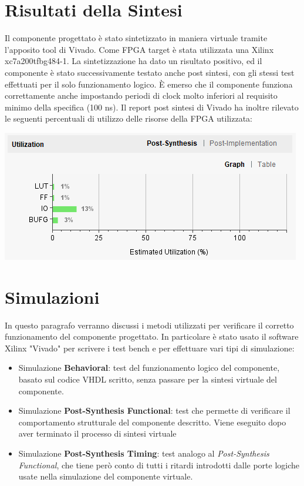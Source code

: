 \documentclass{article}
\begin{document}
\section{Risultati della Sintesi}
Il componente progettato è stato sintetizzato in maniera virtuale tramite l'apposito tool di Vivado. Come FPGA target è stata utilizzata una Xilinx xc7a200tfbg484-1. La sintetizzazione ha dato un risultato positivo, ed il componente è stato successivamente testato anche post sintesi, con gli stessi test effettuati per il solo funzionamento logico. È emerso che il componente funziona correttamente anche impostando periodi di clock molto inferiori al requisito minimo della specifica (100 ns). Il report post sintesi di Vivado ha inoltre rilevato le seguenti percentuali di utilizzo delle risorse della FPGA utilizzata: 
\begin{center}
\includegraphics[scale=0.8]{postSynthesisUtilization} \\
\end{center}

\section{Simulazioni}

In questo paragrafo verranno discussi i metodi utilizzati per verificare il corretto funzionamento del componente progettato. In particolare è stato usato il software Xilinx "Vivado" per scrivere i test bench e per effettuare vari tipi di simulazione:

\begin{itemize}

\item Simulazione \textbf{Behavioral}: test del funzionamento logico del componente, basato sul codice VHDL scritto, senza passare per la sintesi virtuale del componente.

\item Simulazione \textbf{Post-Synthesis Functional}: test che permette di verificare il comportamento strutturale del componente descritto. Viene eseguito dopo aver terminato il processo di sintesi virtuale

\item Simulazione \textbf{Post-Synthesis Timing}: test analogo al \textit{Post-Synthesis Functional}, che tiene però conto di tutti i ritardi introdotti dalle porte logiche usate nella simulazione del componente virtuale.

\end{itemize}
\end{document}
